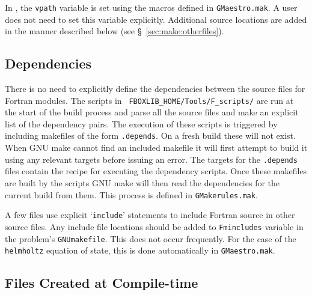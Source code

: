 In \maestro, the {\tt vpath} variable is set using the macros defined
in {\tt GMaestro.mak}.  A user does not need to set this variable
explicitly.  Additional source locations are added in the manner
described below (see \S~\ref{sec:make:otherfiles}).

\subsection{Dependencies}

There is no need to explicitly define the dependencies between the
source files for Fortran modules.  The scripts in {\tt
FBOXLIB\_HOME/Tools/F\_scripts/} are run at the start of the build
process and parse all the source files and make an explicit list of
the dependency pairs.  The execution of these scripts is triggered
by including makefiles of the form {\tt *.depends}.  On a fresh build these
will not exist.  When GNU make cannot find an included makefile it will
first attempt to build it using any relevant targets before issuing an 
error.  The targets for the {\tt *.depends} files contain the recipe for
executing the dependency scripts.  Once these makefiles are built by the
scripts GNU make will then read the dependencies for the current build
from them.  This process is defined in {\tt GMakerules.mak}.

A few files use explicit `{\tt include}' statements to include Fortran
source in other source files.  Any include file locations should be
added to {\tt Fmincludes} variable in the problem's {\tt GNUmakefile}.
This does not occur frequently.  For the case of the {\tt helmholtz}
equation of state, this is done automatically in {\tt GMaestro.mak}.


\subsection{Files Created at Compile-time}

